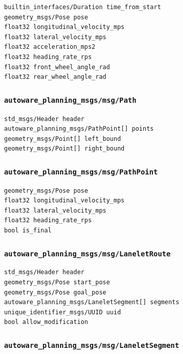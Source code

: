 \documentclass[
]{article}
\begin{document}
\begin{verbatim}
builtin_interfaces/Duration time_from_start
geometry_msgs/Pose pose
float32 longitudinal_velocity_mps
float32 lateral_velocity_mps
float32 acceleration_mps2
float32 heading_rate_rps
float32 front_wheel_angle_rad
float32 rear_wheel_angle_rad
\end{verbatim}

\subsubsection{\texorpdfstring{\texttt{autoware\_planning\_msgs/msg/Path}}{autoware\_planning\_msgs/msg/Path}}\label{autoware_planning_msgsmsgpath}

\begin{verbatim}
std_msgs/Header header
autoware_planning_msgs/PathPoint[] points
geometry_msgs/Point[] left_bound
geometry_msgs/Point[] right_bound
\end{verbatim}

\subsubsection{\texorpdfstring{\texttt{autoware\_planning\_msgs/msg/PathPoint}}{autoware\_planning\_msgs/msg/PathPoint}}\label{autoware_planning_msgsmsgpathpoint}

\begin{verbatim}
geometry_msgs/Pose pose
float32 longitudinal_velocity_mps
float32 lateral_velocity_mps
float32 heading_rate_rps
bool is_final
\end{verbatim}

\subsubsection{\texorpdfstring{\texttt{autoware\_planning\_msgs/msg/LaneletRoute}}{autoware\_planning\_msgs/msg/LaneletRoute}}\label{autoware_planning_msgsmsglaneletroute}

\begin{verbatim}
std_msgs/Header header
geometry_msgs/Pose start_pose
geometry_msgs/Pose goal_pose
autoware_planning_msgs/LaneletSegment[] segments
unique_identifier_msgs/UUID uuid
bool allow_modification
\end{verbatim}

\subsubsection{\texorpdfstring{\texttt{autoware\_planning\_msgs/msg/LaneletSegment}}{autoware\_planning\_msgs/msg/LaneletSegment}}\label{autoware_planning_msgsmsglaneletsegment}
\end{document}
